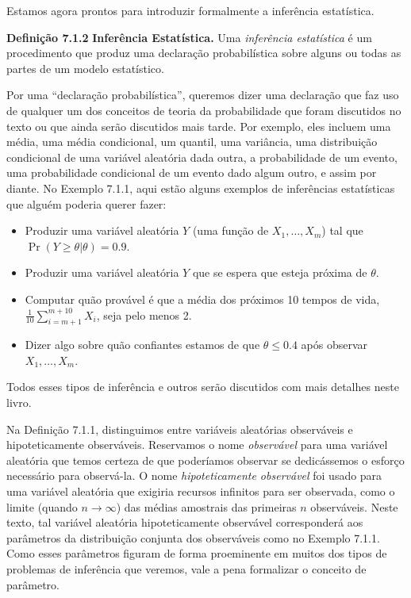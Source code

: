 Estamos agora prontos para introduzir formalmente a inferência estatística.

\vspace{1cm}
\noindent\textbf{Definição 7.1.2} \quad \textbf{Inferência Estatística.} Uma \textit{inferência estatística} é um procedimento que produz uma declaração probabilística sobre alguns ou todas as partes de um modelo estatístico.

\vspace{1cm}
Por uma ``declaração probabilística'', queremos dizer uma declaração que faz uso de qualquer um dos conceitos de teoria da probabilidade que foram discutidos no texto ou que ainda serão discutidos mais tarde. Por exemplo, eles incluem uma média, uma média condicional, um quantil, uma variância, uma distribuição condicional de uma variável aleatória dada outra, a probabilidade de um evento, uma probabilidade condicional de um evento dado algum outro, e assim por diante. No Exemplo 7.1.1, aqui estão alguns exemplos de inferências estatísticas que alguém poderia querer fazer:
\begin{itemize}
    \item Produzir uma variável aleatória $Y$ (uma função de $X_1, \dots, X_m$) tal que $\Pr(Y \ge \theta|\theta) = 0.9$.
    \item Produzir uma variável aleatória $Y$ que se espera que esteja próxima de $\theta$.
    \item Computar quão provável é que a média dos próximos 10 tempos de vida, $\frac{1}{10}\sum_{i=m+1}^{m+10}X_i$, seja pelo menos 2.
    \item Dizer algo sobre quão confiantes estamos de que $\theta \le 0.4$ após observar $X_1, \dots, X_m$.
\end{itemize}

Todos esses tipos de inferência e outros serão discutidos com mais detalhes neste livro.

Na Definição 7.1.1, distinguimos entre variáveis aleatórias observáveis e hipoteticamente observáveis. Reservamos o nome \textit{observável} para uma variável aleatória que temos certeza de que poderíamos observar se dedicássemos o esforço necessário para observá-la. O nome \textit{hipoteticamente observável} foi usado para uma variável aleatória que exigiria recursos infinitos para ser observada, como o limite (quando $n \to \infty$) das médias amostrais das primeiras $n$ observáveis. Neste texto, tal variável aleatória hipoteticamente observável corresponderá aos parâmetros da distribuição conjunta dos observáveis como no Exemplo 7.1.1. Como esses parâmetros figuram de forma proeminente em muitos dos tipos de problemas de inferência que veremos, vale a pena formalizar o conceito de parâmetro.


